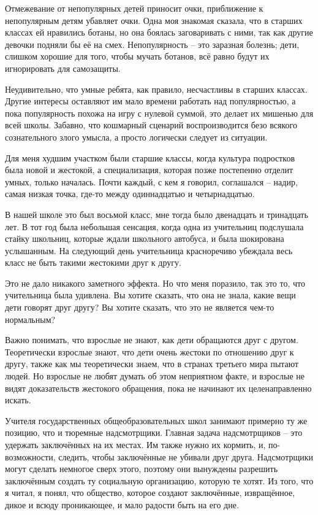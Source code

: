 \documentclass[ebook,12pt,oneside,openany]{memoir}
\begin{document}
Отмежевание от непопулярных детей приносит очки, приближение к
непопулярным детям убавляет очки. Одна моя знакомая сказала, что в
старших классах ей нравились ботаны, но она боялась заговаривать с
ними, так как другие девочки подняли бы её на смех. Непопулярность –
это заразная болезнь; дети, слишком хорошие для того, чтобы мучать
ботанов, всё равно будут их игнорировать для самозащиты.

Неудивительно, что умные ребята, как правило, несчастливы в старших
классах. Другие интересы оставляют им мало времени работать над
популярностью, а пока популярность похожа на игру с нулевой суммой,
это делает их мишенью для всей школы. Забавно, что кошмарный сценарий
воспроизводится безо всякого сознательного злого умысла, а просто
логически следует из ситуации.


Для меня худшим участком были старшие классы, когда культура
подростков была новой и жестокой, а специализация, которая позже
постепенно отделит умных, только началась. Почти каждый, с кем я
говорил, соглашался – надир, самая низкая точка, где-то между
одиннадцатью и четырнадцатью.

В нашей школе это был восьмой класс, мне тогда было двенадцать и
тринадцать лет. В тот год была небольшая сенсация, когда одна из
учительниц подслушала стайку школьниц, которые ждали школьного
автобуса, и была шокирована услышанным. На следующий день учительница
красноречиво убеждала весь класс не быть такими жестокими друг к
другу.

Это не дало никакого заметного эффекта. Но что меня поразило, так это
то, что учительница была удивлена. Вы хотите сказать, что она не
знала, какие вещи дети говорят друг другу? Вы хотите сказать, что это
не является чем-то нормальным?

Важно понимать, что взрослые не знают, как дети обращаются друг с
другом. Теоретически взрослые знают, что дети очень жестоки по
отношению друг к другу, также как мы теоретически знаем, что в странах
третьего мира пытают людей. Но взрослые не любят думать об этом
неприятном факте, и взрослые не видят доказательств жестокого
обращения, пока не начинают их целенаправленно искать.

Учителя государственных общеобразовательных школ занимают примерно ту
же позицию, что и тюремные надсмотрщики. Главная задача надсмотрщиков
– это удержать заключённых на их местах. Им также нужно их кормить, и,
по-возможности, следить, чтобы заключённые не убивали друг друга.
Надсмотрщики могут сделать немногое сверх этого, поэтому они вынуждены
разрешить заключённым создать ту социальную организацию, которую те
хотят. Из того, что я читал, я понял, что общество, которое создают
заключённые, извращённое, дикое и всюду проникающее, и мало радости
быть на его дне.
\end{document}
